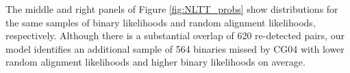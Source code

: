 \documentclass[usenatbib]{mnras}
\newcommand{\given}{\,|\,}
\begin{document}
The middle and right panels of Figure \ref{fig:NLTT_probs} show distributions for the same samples of binary likelihoods and random alignment likelihoods, respectively. Although there is a substantial overlap of 620 re-detected pairs, our model identifies an additional sample of 564 binaries missed by CG04 with lower random alignment likelihoods and higher binary likelihoods on average. 





\begin{comment}

Gray points in each panel of Figure \ref{fig:NLTT_probabilities} show the distribution of $P(\vec{x}_i \given C_1, \vec{x}_j)$ and $P(\vec{x}_i \given C_2, \vec{x}_j)$ for the pairs we identify. Comparison with the dashed lines corresponding to posterior probabilities of 50\% and 90\% indicate that the majority of these binaries are detected with very high significance. 

Of the sample identified by CG04, we redetect 707 pairs ($\approx 70$\%) with a posterior probability greater than 50\%. Colored points in the four panels of Figure \ref{fig:NLTT_probabilities} compare the pairs in CG04 with all 946 pairs that we identify, indicated as gray points. The top left panel shows the disk binaries, the top right panel shows the binaries containing a WD, the bottom left panel shows the halo binaries, and the bottom right binary shows those binaries detected but ultimately rejected by CG04 for reasons provided in the legend. Differences between the two samples are substantial.  


\end{comment}
\end{document}
